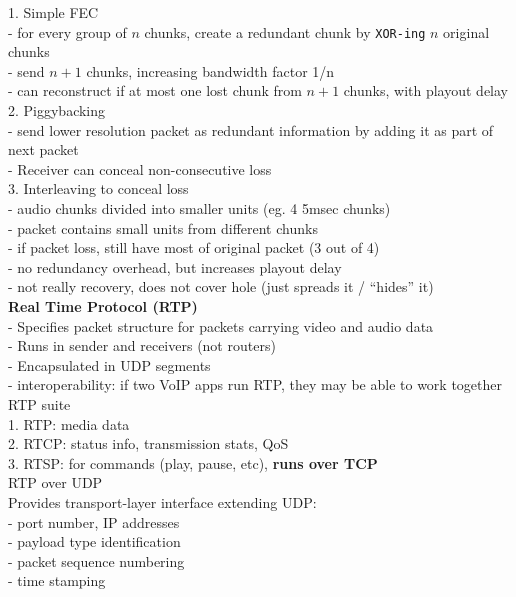 \documentclass[10pt, a4paper]{article}
\newcommand{\highlight}[1]{{\color{red}\textbf{#1}}}
\newcommand{\blue}[1]{{\color{MidnightBlue}#1}}
\begin{document}
\begin{multicols*}{3}
		1. Simple FEC\\
		- for every group of $n$ chunks, create a redundant chunk by \texttt{XOR-ing} $n$ original chunks\\
		- send $n+1$ chunks, increasing bandwidth factor 1/n\\
		- can reconstruct if at most one lost chunk from $n+1$ chunks, with playout delay\\

		2. Piggybacking\\
		- send lower resolution packet as redundant information by adding it as part of next packet\\
		- Receiver can conceal \blue{non-consecutive loss}\\

		3. Interleaving to conceal loss\\
		- audio chunks divided into smaller units (eg. 4 5msec chunks)\\
		- packet contains small units from different chunks\\
		- if packet loss, still have most of original packet (3 out of 4)\\
		- no redundancy overhead, but increases playout delay\\
		- not really recovery, does not cover hole (just spreads it / ``hides'' it)\\

		\textbf{Real Time Protocol (RTP)}\\
		- Specifies packet structure for packets carrying video and audio data\\
		- Runs in sender and receivers (not routers)\\
		- Encapsulated in UDP segments\\
		- interoperability: if two VoIP apps run RTP, they may be able to work together\\

		RTP suite\\
		1. RTP: media data\\
		2. RTCP: status info, transmission stats, QoS\\
		3. RTSP: for commands (play, pause, etc), \highlight{runs over TCP}\\

		RTP over UDP\\
		Provides transport-layer interface extending UDP:\\
		- port number, IP addresses\\
		- payload type identification\\
		- packet sequence numbering\\
		- time stamping\\


\end{multicols*}
\end{document}
